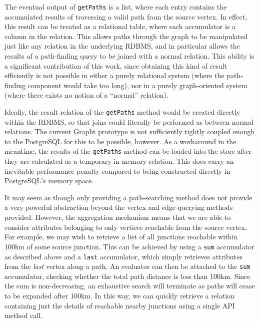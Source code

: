 The eventual output of \texttt{getPaths} is a list, where each entry contains
the accumulated results of traversing a valid path from the source vertex. In
effect, this result can be treated as a relational table, where each
accumulator is a column in the relation. This allows paths through the graph to
be manipulated just like any relation in the underlying RDBMS, and in
particular allows the results of a path-finding query to be joined with a
normal relation. This ability is a significant contribution of this work, since
obtaining this kind of result efficiently is not possible in either a purely
relational system (where  the path-finding component would take too long), nor
in a purely graph-oriented  system (where there exists no notion of a ``normal''
relation).  %

Ideally, the result relation of the \texttt{getPaths} method would be created
directly within the RDBMS, so that joins could literally be
performed as between normal relations. The current Grapht prototype is not sufficiently
tightly coupled enough to the PostgreSQL for this to be possible,
however. As a workaround in the meantime, the results of the \texttt{getPaths}
method can be loaded into the store after they are calculated as a temporary
in-memory relation. This does carry an inevitable performance  penalty
compared to being constructed directly in PostgreSQL's memory space.

It may seem as though only providing a path-searching method does not provide
a  very powerful abstraction beyond the vertex and edge-querying methods
provided.  However, the aggregation mechanism means that we are able to
consider attributes belonging to only vertices reachable from the source vertex.
For example,  we may wish to retrieve a list of all junctions reachable within
100km of some source junction. This can be achieved by using a
\texttt{sum} accumulator as described above and a \texttt{last} accumulator,
which simply retrieves attributes from the \textit{last} vertex along a path.
An evaluator can then be attached to the \texttt{sum} accumulator, checking
whether the total path distance is less than 100km. Since the sum is
non-decreasing, an exhaustive search will terminate as paths will cease to be
expanded after 100km. In this way, we can quickly retrieve a relation
containing just the details of reachable nearby junctions using a single API method call.






